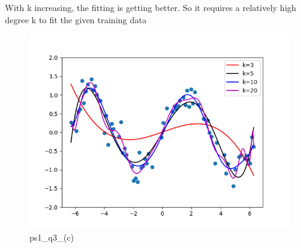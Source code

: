 \begin{answer}

With k increasing, the fitting is getting better. So it requires a relatively high degree k to fit the given training data
\begin{figure}[H]
    \centering
    \includegraphics[width=0.5\linewidth]{ps1_q3_(c).png}
    \caption{ps1\_q3\_(c)}
    \label{fig:enter-label}
\end{figure}
\end{answer}
